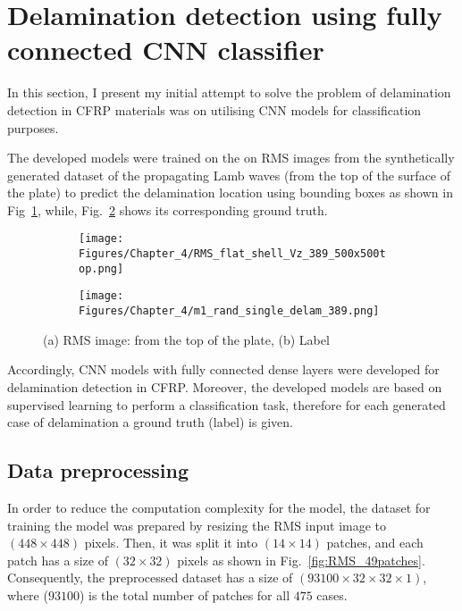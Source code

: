 \section{Delamination detection using fully connected CNN classifier}
\label{sec42}

In this section, I present my initial attempt to solve the problem of delamination detection in CFRP materials was on utilising CNN models for classification purposes.

The developed models were trained on the on RMS images from the synthetically generated dataset of the propagating Lamb waves (from the top of the surface of the plate) to predict the delamination location using bounding boxes as shown in Fig~\ref{fig:RMS_14}, while, Fig.~\ref{fig:label_14} shows its corresponding ground truth.
\begin{figure} [h!]
	\centering
	\begin{subfigure}[b]{0.47\textwidth}
		\centering
		\texttt{[image: Figures/Chapter\_4/RMS\_flat\_shell\_Vz\_389\_500x500top.png]}
		\caption{}
		\label{fig:RMS_14}
	\end{subfigure}
	\hfill
	\begin{subfigure}[b]{0.47\textwidth}
		\centering
		\texttt{[image: Figures/Chapter\_4/m1\_rand\_single\_delam\_389.png]}
		\caption{}
		\label{fig:label_14}
	\end{subfigure}
	\caption{(a) RMS image: from the top of the plate, (b) Label}
	\label{fig:RMS_GT}
\end{figure} 

Accordingly, CNN models with fully connected dense layers were developed for delamination detection in CFRP.
Moreover, the developed models are based on supervised learning to perform a classification task, therefore for each generated case of delamination a ground truth (label) is given.
 
\subsection{Data preprocessing}
\label{sec421}
In order to reduce the computation complexity for the model, the dataset for training the model was prepared by resizing the RMS input image to \((448\times 448)\) pixels.  
Then, it was split it into \((14\times 14)\) patches, and each patch has a size of \((32\times 32)\) pixels as shown in Fig.~\ref{fig:RMS_49patches}.
Consequently, the preprocessed dataset has a size of \((93100\times 32\times 32 \times 1)\), where (\(93100\)) is the total number of patches for all \(475\) cases.

